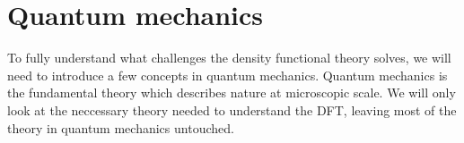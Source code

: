 \section{Quantum mechanics}

To fully understand what challenges the density functional theory solves, we will need to introduce a few concepts in quantum mechanics. Quantum mechanics is the fundamental theory which describes nature at microscopic scale. We will only look at the neccessary theory needed to understand the DFT, leaving most of the theory in quantum mechanics untouched.

